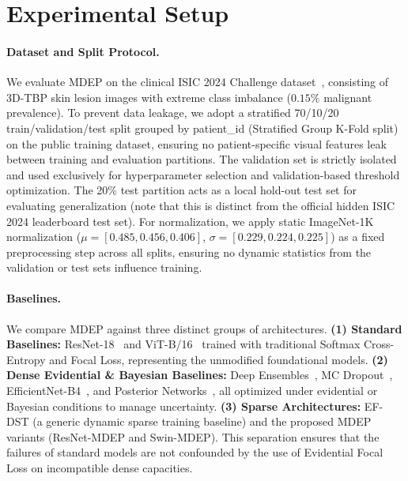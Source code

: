 \documentclass[letterpaper]{article} %
\begin{document}
\section{Experimental Setup}\label{sec:experiment}

\paragraph{Dataset and Split Protocol.} We evaluate MDEP on the clinical ISIC 2024 Challenge dataset~\cite{isic2024}, consisting of 3D-TBP skin lesion images with extreme class imbalance ($0.15\%$ malignant prevalence). To prevent data leakage, we adopt a stratified 70/10/20 train/validation/test split grouped by patient\_id (Stratified Group K-Fold split) on the public training dataset, ensuring no patient-specific visual features leak between training and evaluation partitions. The validation set is strictly isolated and used exclusively for hyperparameter selection and validation-based threshold optimization. The 20\% test partition acts as a local hold-out test set for evaluating generalization (note that this is distinct from the official hidden ISIC 2024 leaderboard test set). For normalization, we apply static ImageNet-1K normalization ($\mu = [0.485, 0.456, 0.406]$, $\sigma = [0.229, 0.224, 0.225]$) as a fixed preprocessing step across all splits, ensuring no dynamic statistics from the validation or test sets influence training.

\paragraph{Baselines.} We compare MDEP against three distinct groups of architectures. \textbf{(1) Standard Baselines:} ResNet-18~\cite{he2016deep} and ViT-B/16~\cite{dosovitskiy2021image} trained with traditional Softmax Cross-Entropy and Focal Loss, representing the unmodified foundational models. \textbf{(2) Dense Evidential \& Bayesian Baselines:} Deep Ensembles~\cite{lakshminarayanan2017simple}, MC Dropout~\cite{gal2016dropout}, EfficientNet-B4~\cite{tan2019efficientnet}, and Posterior Networks~\cite{charpentier2020posterior}, all optimized under evidential or Bayesian conditions to manage uncertainty. \textbf{(3) Sparse Architectures:} EF-DST (a generic dynamic sparse training baseline) and the proposed MDEP variants (ResNet-MDEP and Swin-MDEP). This separation ensures that the failures of standard models are not confounded by the use of Evidential Focal Loss on incompatible dense capacities.
\end{document}
